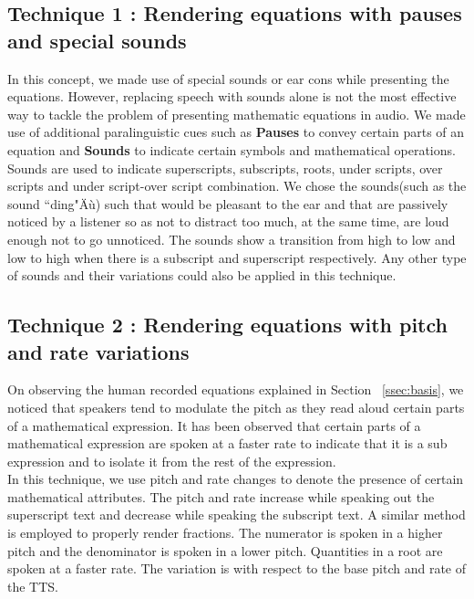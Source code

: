 \documentclass{article}
\begin{document}
\subsection{ Technique 1 : Rendering equations with pauses and special sounds}
\label{ssec:t1}
 In this concept, we made use of special sounds or ear cons while presenting the equations. However, replacing speech with sounds alone is not the most effective way to tackle the problem of presenting mathematic equations in audio. We made use of additional paralinguistic cues such as  \textbf{Pauses} to convey certain parts of an equation and \textbf{Sounds} to indicate certain symbols and mathematical operations.
Sounds are used to indicate superscripts, subscripts, roots, under scripts, over scripts and under script-over script combination.
We chose the sounds(such as the sound ``ding"Äù) such that would be pleasant to the ear and that are passively noticed by a listener so as not to distract too much, at the same time, are loud enough not to go unnoticed. The sounds show a transition from high to low and low to high when there is a subscript and superscript respectively. Any other type of sounds  and their variations could also be applied in this technique.








\subsection{Technique 2 : Rendering equations with pitch and rate variations}
\label{ssec:t2}

 On observing the human recorded equations explained in Section ~\ref{ssec:basis}, we noticed that speakers tend to modulate the pitch as they read aloud certain parts of a mathematical expression. It has been observed that certain parts of a mathematical expression are spoken at a faster rate to indicate that it is a sub expression and to isolate it from the rest of the expression. \\

In this technique, we use pitch and rate changes to denote the presence of certain mathematical attributes. The pitch and rate increase while speaking out the superscript text and decrease while speaking the subscript text. A similar method is employed to properly render fractions. The numerator is spoken in a higher pitch and the denominator is spoken in a lower pitch. Quantities in a root are spoken at a faster rate. The variation is with respect to the base pitch and rate of the TTS.
\end{document}
